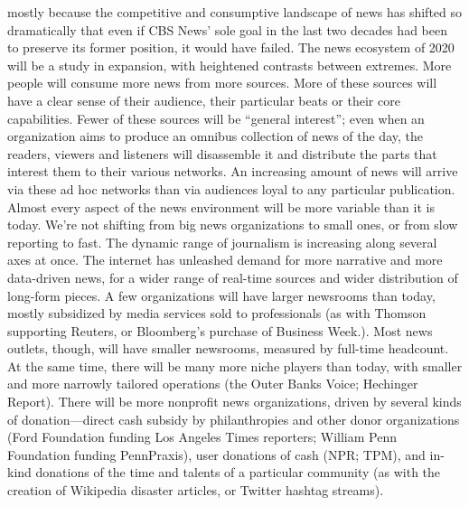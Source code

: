 mostly because the competitive and consumptive landscape of news has shifted
so dramatically that even if CBS News’ sole goal in the last two decades had been
to preserve its former position, it would have failed.
The news ecosystem of 2020 will be a study in expansion, with heightened
contrasts between extremes. More people will consume more news from more
sources. More of these sources will have a clear sense of their audience, their
particular beats or their core capabilities. Fewer of these sources will be ``general
interest''; even when an organization aims to produce an omnibus collection of
news of the day, the readers, viewers and listeners will disassemble it and distribute
the parts that interest them to their various networks. An increasing amount
of news will arrive via these ad hoc networks than via audiences loyal to any
particular publication.
Almost every aspect of the news environment will be more variable than it is
today. We’re not shifting from big news organizations to small ones, or from slow
reporting to fast. The dynamic range of journalism is increasing along several
axes at once. The internet has unleashed demand for more narrative and more
data-driven news, for a wider range of real-time sources and wider distribution
of long-form pieces.
A few organizations will have larger newsrooms than today, mostly subsidized
by media services sold to professionals (as with Thomson supporting Reuters, or
Bloomberg’s purchase of Business Week.). Most news outlets, though, will have
smaller newsrooms, measured by full-time headcount. At the same time, there
will be many more niche players than today, with smaller and more narrowly
tailored operations (the Outer Banks Voice; Hechinger Report).
There will be more nonprofit news organizations, driven by several kinds of
donation—direct cash subsidy by philanthropies and other donor organizations
(Ford Foundation funding Los Angeles Times reporters; William Penn Foundation
funding PennPraxis), user donations of cash (NPR; TPM), and in-kind
donations of the time and talents of a particular community (as with the creation
of Wikipedia disaster articles, or Twitter hashtag streams).

